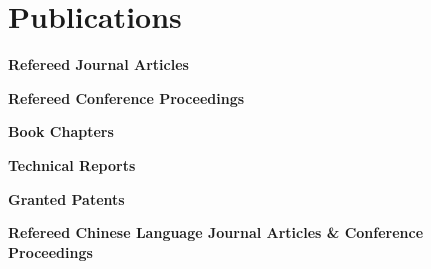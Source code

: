 \documentclass[11pt]{article}
\newenvironment{main}
{\begin{adjustwidth}{3em}{}}
{\end{adjustwidth}}
\begin{document}
\section*{Publications}
\begin{main}

\textbf{Refereed Journal Articles}
\begin{refsection}
  \nocite{
    ammar2023identifying,
    avetisyan2022design,
    sun2021online,
    yu2019examination,
    feng2018estimation,
    feng2018drivers,
    feng2018effects,
    feng2017can,
    feng2017computer,
    cheng2012driver,
  }
\printbibliography[heading=none]  %
\end{refsection}

\textbf{Refereed Conference Proceedings}
\begin{refsection}
  \nocite{
    feng2023development,
    aditya2023systematic,
    munnamgi2022automatic,
    feng2021cyclingsim,
    feng2020naturalistic,
    bao2019examination,
    yu2019drivers,
    feng2018vehicle,
    jeong2017computational,
    feng2016spectral,
    chen2016development,
    feng2014computer,
    feng2013computational,
    feng2009board,
    zhang2008a,
    zhang2008b,
    lin2008analysis,
  }
\printbibliography[heading=none]  %
\end{refsection}

\textbf{Book Chapters}
\begin{refsection}
  \nocite{
    owens2019automated,
    pradhan2019training,
  }
\printbibliography[heading=none]  %
\end{refsection}

\textbf{Technical Reports}
\begin{refsection}
  \nocite{
    feng2013speech,
    chen2012survey,
  }
\printbibliography[heading=none]  %
\end{refsection}

\textbf{Granted Patents}
\begin{refsection}
  \nocite{
    Sarvestani2019systems,
    delp2020system,
    delp2020passing, 
  }
\printbibliography[heading=none]  %
\end{refsection}


\textbf{Refereed Chinese Language Journal Articles \& Conference Proceedings}
\begin{refsection}
  \nocite{
    zhang2010real,
    cheng2009driver,
    cheng2008real,
    feng2008rear,
    cheng2007review,
  }
\printbibliography[heading=none]  %
\end{refsection}


\end{main}
\end{document}
